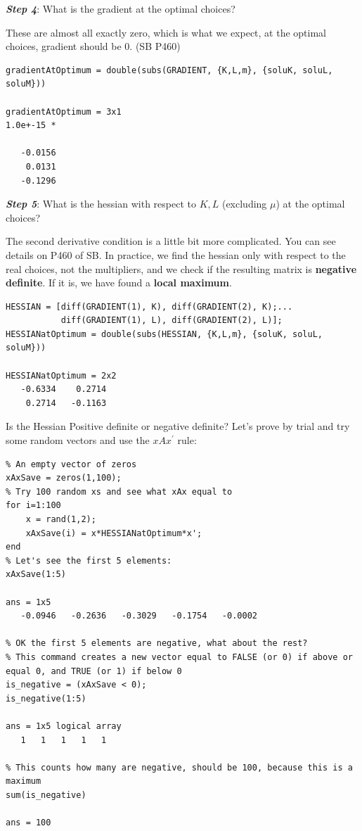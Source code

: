 \documentclass[
]{book}
\begin{document}
\textbf{\emph{Step 4}}: What is the gradient at the optimal choices?

These are almost all exactly zero, which is what we expect, at the
optimal choices, gradient should be 0. (SB P460)

\begin{verbatim}
gradientAtOptimum = double(subs(GRADIENT, {K,L,m}, {soluK, soluL, soluM}))

gradientAtOptimum = 3x1    
1.0e+-15 *

   -0.0156
    0.0131
   -0.1296
\end{verbatim}

\textbf{\emph{Step 5}}: What is the hessian with respect to \(K,L\) (excluding
\(\mu\)) at the optimal choices?

The second derivative condition is a little bit more complicated. You
can see details on P460 of SB. In practice, we find the hessian only
with respect to the real choices, not the multipliers, and we check if
the resulting matrix is \textbf{negative definite}. If it is, we have found a
\textbf{local maximum}.

\begin{verbatim}
HESSIAN = [diff(GRADIENT(1), K), diff(GRADIENT(2), K);...
           diff(GRADIENT(1), L), diff(GRADIENT(2), L)];
HESSIANatOptimum = double(subs(HESSIAN, {K,L,m}, {soluK, soluL, soluM}))

HESSIANatOptimum = 2x2    
   -0.6334    0.2714
    0.2714   -0.1163
\end{verbatim}

Is the Hessian Positive definite or negative definite? Let's prove by
trial and try some random vectors and use the \(xAx^{\prime }\) rule:

\begin{verbatim}
% An empty vector of zeros
xAxSave = zeros(1,100);
% Try 100 random xs and see what xAx equal to
for i=1:100
    x = rand(1,2);
    xAxSave(i) = x*HESSIANatOptimum*x';
end
% Let's see the first 5 elements:
xAxSave(1:5)

ans = 1x5    
   -0.0946   -0.2636   -0.3029   -0.1754   -0.0002

% OK the first 5 elements are negative, what about the rest?
% This command creates a new vector equal to FALSE (or 0) if above or equal 0, and TRUE (or 1) if below 0
is_negative = (xAxSave < 0);
is_negative(1:5)

ans = 1x5 logical array    
   1   1   1   1   1

% This counts how many are negative, should be 100, because this is a maximum
sum(is_negative)

ans = 100
\end{verbatim}
\end{document}
